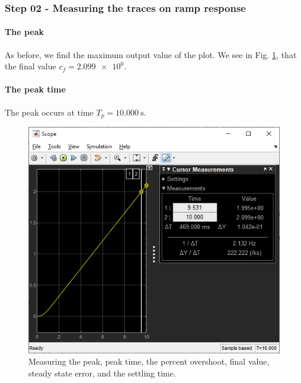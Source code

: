 \documentclass[12pt]{article}
\begin{document}
\subsubsection{Step 02 - Measuring the traces on ramp response}



\paragraph{The peak} As before, we find the maximum output value of the plot.
We see in Fig. \ref{fig:ramp - measuring peak}, that the final value $c_f = \num{2.099e+0}$.

\paragraph{The peak time} The peak occurs at time $T_p = \SI{10.000}\second$.

\begin{figure}[h]
    \centering
    \includegraphics[width=\linewidth]{part01b_measuring_peak.png}
    \caption{Measuring the peak, peak time, the percent overshoot, final value, steady state error, and the settling time.}
    \label{fig:ramp - measuring peak}
\end{figure}
\end{document}
